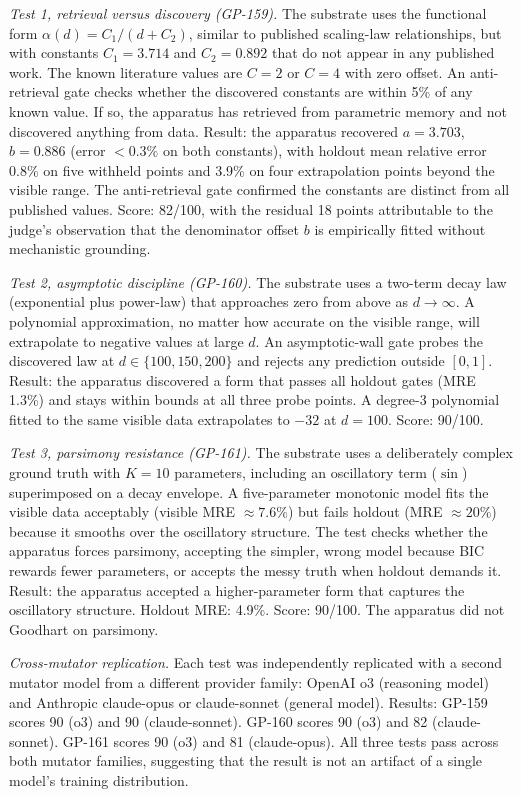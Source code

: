 \documentclass[
  11pt,
]{article}
\begin{document}
\emph{Test 1, retrieval versus discovery (GP-159).} The substrate uses
the functional form \(\alpha(d) = C_1 / (d + C_2)\), similar to published
scaling-law relationships, but with constants \(C_1 = 3.714\) and
\(C_2 = 0.892\) that do not appear in any published work. The known
literature values are \(C = 2\) or \(C = 4\) with zero offset. An
anti-retrieval gate checks whether the discovered constants are within 5\%
of any known value. If so, the apparatus has retrieved from parametric
memory and not discovered anything from data. Result: the apparatus
recovered \(a = 3.703\), \(b = 0.886\) (error \({<}0.3\%\) on both
constants), with holdout mean relative error 0.8\% on five withheld points
and 3.9\% on four extrapolation points beyond the visible range. The
anti-retrieval gate confirmed the constants are distinct from all
published values. Score: 82/100, with the residual 18 points attributable
to the judge's observation that the denominator offset \(b\) is
empirically fitted without mechanistic grounding.

\emph{Test 2, asymptotic discipline (GP-160).} The substrate uses a
two-term decay law (exponential plus power-law) that approaches zero from
above as \(d \to \infty\). A polynomial approximation, no matter how
accurate on the visible range, will extrapolate to negative values at
large \(d\). An asymptotic-wall gate probes the discovered law at
\(d \in \{100, 150, 200\}\) and rejects any prediction outside
\([0, 1]\). Result: the apparatus discovered a form that passes all
holdout gates (MRE 1.3\%) and stays within bounds at all three probe
points. A degree-3 polynomial fitted to the same visible data
extrapolates to \(-32\) at \(d = 100\). Score: 90/100.

\emph{Test 3, parsimony resistance (GP-161).} The substrate uses a
deliberately complex ground truth with \(K = 10\) parameters, including an
oscillatory term (\(\sin\)) superimposed on a decay envelope. A
five-parameter monotonic model fits the visible data acceptably (visible
MRE \({\approx}7.6\%\)) but fails holdout (MRE \({\approx}20\%\)) because
it smooths over the oscillatory structure. The test checks whether the
apparatus forces parsimony, accepting the simpler, wrong model because BIC
rewards fewer parameters, or accepts the messy truth when holdout demands
it. Result: the apparatus accepted a higher-parameter form that captures
the oscillatory structure. Holdout MRE: 4.9\%. Score: 90/100. The
apparatus did not Goodhart on parsimony.

\emph{Cross-mutator replication.} Each test was independently replicated
with a second mutator model from a different provider family: OpenAI o3
(reasoning model) and Anthropic claude-opus or claude-sonnet (general
model). Results: GP-159 scores 90 (o3) and 90 (claude-sonnet). GP-160
scores 90 (o3) and 82 (claude-sonnet). GP-161 scores 90 (o3) and 81
(claude-opus). All three tests pass across both mutator families,
suggesting that the result is not an artifact of a single model's training
distribution.
\end{document}
